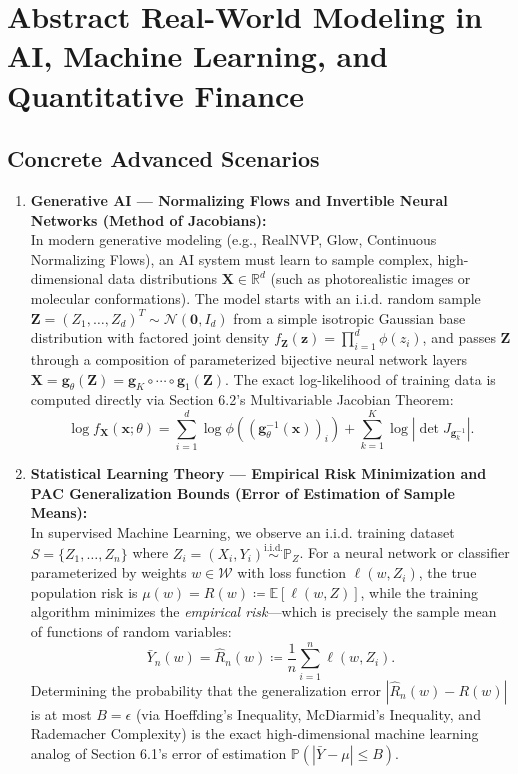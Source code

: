 \documentclass[11pt, letterpaper]{article}
\theoremstyle{definition}
\theoremstyle{remark}
\newcommand{\R}{\mathbb{R}}
\newcommand{\E}{\mathbb{E}}
\newcommand{\Prob}{\mathbb{P}}
\begin{document}
\section{Abstract Real-World Modeling in AI, Machine Learning, and Quantitative Finance}

\subsection{Concrete Advanced Scenarios}

\begin{enumerate}[label=\textbf{Scenario \arabic*:}]
    \item \textbf{Generative AI — Normalizing Flows and Invertible Neural Networks (Method of Jacobians):} \\ \relax
    In modern generative modeling (e.g., RealNVP, Glow, Continuous Normalizing Flows), an AI system must learn to sample complex, high-dimensional data distributions $\mathbf{X} \in \R^d$ (such as photorealistic images or molecular conformations). The model starts with an i.i.d. random sample $\mathbf{Z} = (Z_1, \dots, Z_d)^T \sim \mathcal{N}(\mathbf{0}, I_d)$ from a simple isotropic Gaussian base distribution with factored joint density $f_{\mathbf{Z}}(\mathbf{z}) = \prod_{i=1}^d \phi(z_i)$, and passes $\mathbf{Z}$ through a composition of parameterized bijective neural network layers $\mathbf{X} = \mathbf{g}_{\theta}(\mathbf{Z}) = \mathbf{g}_K \circ \cdots \circ \mathbf{g}_1(\mathbf{Z})$. The exact log-likelihood of training data is computed directly via Section 6.2's Multivariable Jacobian Theorem:
    \[
        \log f_{\mathbf{X}}(\mathbf{x}; \theta) = \sum_{i=1}^{d} \log \phi\left(\left(\mathbf{g}_{\theta}^{-1}(\mathbf{x})\right)_i\right) + \sum_{k=1}^{K} \log \left|\det J_{\mathbf{g}_k^{-1}}\right|.
    \]

    \item \textbf{Statistical Learning Theory — Empirical Risk Minimization and PAC Generalization Bounds (Error of Estimation of Sample Means):} \\ \relax
    In supervised Machine Learning, we observe an i.i.d. training dataset $S = \{Z_1, \dots, Z_n\}$ where $Z_i = (X_i, Y_i) \stackrel{\text{i.i.d.}}{\sim} \Prob_Z$. For a neural network or classifier parameterized by weights $w \in \mathcal{W}$ with loss function $\ell(w, Z_i)$, the true population risk is $\mu(w) = R(w) \coloneqq \E[\ell(w, Z)]$, while the training algorithm minimizes the \emph{empirical risk}—which is precisely the sample mean of functions of random variables:
    \[
        \bar{Y}_n(w) = \hat{R}_n(w) \coloneqq \frac{1}{n} \sum_{i=1}^{n} \ell(w, Z_i).
    \]
    Determining the probability that the generalization error $|\hat{R}_n(w) - R(w)|$ is at most $B = \epsilon$ (via Hoeffding's Inequality, McDiarmid's Inequality, and Rademacher Complexity) is the exact high-dimensional machine learning analog of Section 6.1's error of estimation $\Prob(|\bar{Y} - \mu| \le B)$.


\end{enumerate}
\end{document}
